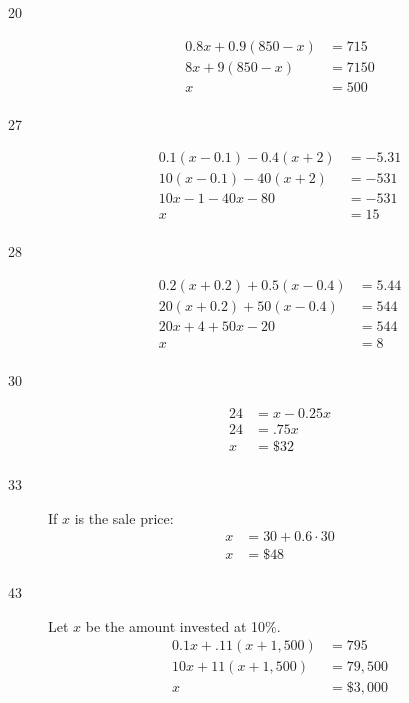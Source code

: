 \documentclass[letterpaper]{exam}
\begin{document}
\begin{description}
      \item[20]
        \begin{align*}
          0.8x + 0.9 (850 - x) & = 715 \\
          8x + 9(850 - x)      & = 7150 \\
          x                    & = \boxed{ 500 } \\
        \end{align*}

      \item[27]
        \begin{align*}
          0.1 (x - 0.1) - 0.4(x + 2) & = -5.31 \\
          10(x - 0.1) - 40(x + 2)    & = -531 \\
          10x - 1 - 40x - 80         & = -531 \\
          x                          & = \boxed{ 15 } \\
        \end{align*}

      \item[28]
        \begin{align*}
          0.2(x + 0.2) + 0.5(x - 0.4) & = 5.44 \\
          20(x + 0.2) + 50(x - 0.4)   & = 544 \\
          20x + 4 + 50x - 20          & = 544 \\
          x                           & = \boxed{ 8 } \\
        \end{align*}

      \item[30]
        \begin{align*}
          24 & = x - 0.25x \\
          24 & = .75x \\
          x  & = \boxed{ \$32 } \\
        \end{align*}

      \item[33] 
        If $x$ is the sale price:
        \begin{align*}
          x & = 30 + 0.6 \cdot 30 \\
          x & = \boxed{ \$48 } \\
        \end{align*}

      \item[43] Let $x$ be the amount invested at 10\%.
        \begin{align*}
          0.1x + .11(x + 1,500) & = 795 \\
          10x + 11(x + 1,500)   & = 79,500 \\
          x                    & = \boxed{ \$3,000 } \\
        \end{align*}

      \end{description}
\end{document}
